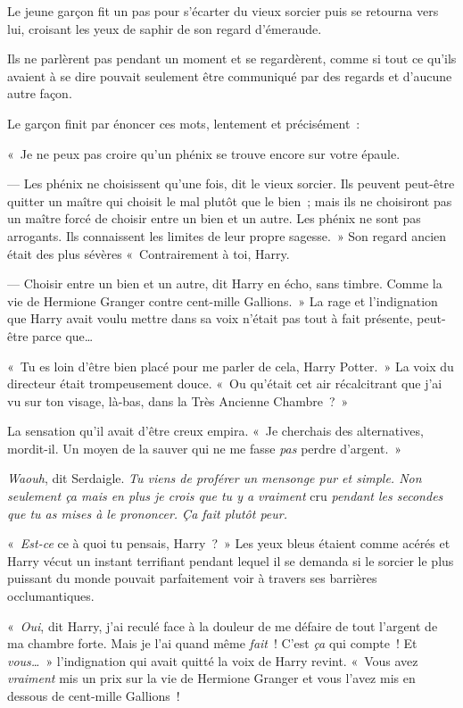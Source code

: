 Le jeune garçon fit un pas pour s'écarter du vieux sorcier puis se retourna vers lui, croisant les yeux de saphir de son regard d'émeraude.

Ils ne parlèrent pas pendant un moment et se regardèrent, comme si tout ce qu'ils avaient à se dire pouvait seulement être communiqué par des regards et d'aucune autre façon.

Le garçon finit par énoncer ces mots, lentement et précisément~:

«~Je ne peux pas croire qu'un phénix se trouve encore sur votre épaule.

--- Les phénix ne choisissent qu'une fois, dit le vieux sorcier.
Ils peuvent peut-être quitter un maître qui choisit le mal plutôt que le bien~; mais ils ne choisiront pas un maître forcé de choisir entre un bien et un autre.
Les phénix ne sont pas arrogants.
Ils connaissent les limites de leur propre sagesse.~»
Son regard ancien était des plus sévères «~Contrairement à toi, Harry.

--- Choisir entre un bien et un autre, dit Harry en écho, sans timbre.
Comme la vie de Hermione Granger contre cent-mille Gallions.~»
La rage et l'indignation que Harry avait voulu mettre dans sa voix n'était pas tout à fait présente, peut-être parce que…

«~Tu es loin d'être bien placé pour me parler de cela, Harry Potter.~»
La voix du directeur était trompeusement douce.
«~Ou qu'était cet air récalcitrant que j'ai vu sur ton visage, là-bas, dans la Très Ancienne Chambre~?~»

La sensation qu'il avait d'être creux empira.
«~Je cherchais des alternatives, mordit-il.
Un moyen de la sauver qui ne me fasse \emph{pas} perdre d'argent.~»

\emph{Waouh}, dit Serdaigle.
\emph{Tu viens de proférer un mensonge pur et simple.
Non seulement ça mais en plus je crois que tu y a vraiment} cru \emph{pendant les secondes que tu as mises à le prononcer.
Ça fait plutôt peur.}

«~\emph{Est-ce} ce à quoi tu pensais, Harry~?~»
Les yeux bleus étaient comme acérés et Harry vécut un instant terrifiant pendant lequel il se demanda si le sorcier le plus puissant du monde pouvait parfaitement voir à travers ses barrières occlumantiques.

«~\emph{Oui}, dit Harry, j'ai reculé face à la douleur de me défaire de tout l'argent de ma chambre forte.
Mais je l'ai quand même \emph{fait}~!
C'est \emph{ça} qui compte~!
Et \emph{vous…}~» l'indignation qui avait quitté la voix de Harry revint.
«~Vous avez \emph{vraiment} mis un prix sur la vie de Hermione Granger et vous l'avez mis en dessous de cent-mille Gallions~!

